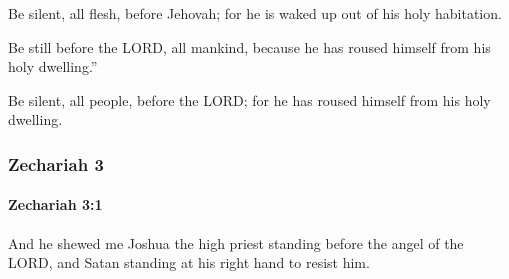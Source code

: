 			\begin{versebox}
					\item[BHS] 
					\item[LXX] 
					\item[ASV] Be silent, all flesh, before Jehovah; for he is waked up out of his holy habitation.
					\item[NIV] Be still before the LORD, all mankind, because he has roused himself from his holy dwelling.”
					\item[NRSV] Be silent, all people, before the LORD; for he has roused himself from his holy dwelling.
			\end{versebox}
	\subsubsection{Zechariah 3} %
		\label{ZECHARIAH-3}

		\paragraph{Zechariah 3:1} %
			\label{ZECHARIAH-3-1}

			And he shewed me Joshua the high priest standing before the angel of the LORD, and Satan standing at his right hand to resist him.

